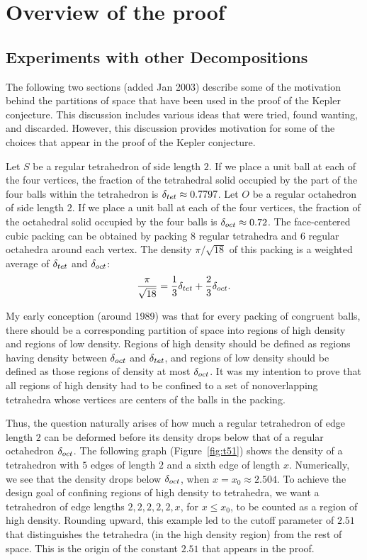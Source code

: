 \chapter{Overview of the proof}

\section{Experiments with other Decompositions}
\label{sec:experiment}

The following two sections (added Jan 2003)  describe some of the
motivation behind the partitions of space that have been used in the
proof of the Kepler conjecture.  This discussion includes various
ideas that were tried, found wanting, and discarded. However, this
discussion provides motivation for some of the choices that appear
in the proof of the Kepler conjecture.

Let $S$ be a regular tetrahedron of side length $2$.  If we place a
unit ball at each of the four vertices, the fraction of the
tetrahedral solid occupied by the part of the four balls within the
tetrahedron is $\delta_{tet}\approx 0.7797$. Let $O$ be a regular
octahedron of side length $2$.  If we place a unit ball at each of
the four vertices, the fraction of the octahedral solid occupied by
the four balls is $\delta_{oct}\approx 0.72$. The face-centered cubic
packing can be obtained by packing $8$ regular tetrahedra and $6$
regular octahedra around each vertex. The density $\pi/\sqrt{18}$ of
this packing is a weighted average of $\delta_{tet}$ and $\delta_{oct}$:
    $$\frac\pi{\sqrt{18}} = \frac13\delta_{tet} + \frac23\delta_{oct}.$$

My early conception (around 1989) was that for every packing of
congruent balls, there should be a corresponding partition of space
into regions of high density and regions of low density. Regions of
high density should be defined as regions having density between
$\delta_{oct}$ and $\delta_{tet}$, and regions of low density should be defined as
those regions of density at most $\delta_{oct}$.  It was my intention to
prove that all regions of high density had to be confined to a set
of nonoverlapping tetrahedra whose vertices are centers of the balls
in the packing.

Thus, the question naturally arises of how much a regular
tetrahedron of edge length $2$ can be deformed before its density
drops below that of a regular octahedron $\delta_{oct}$.  The following
graph (Figure~\ref{fig:t51}) shows the density of a tetrahedron
with $5$ edges of length $2$ and a sixth edge of length $x$.
Numerically, we see that the density drops below $\delta_{oct}$, when
$x=x_0\approx 2.504$. To achieve the design goal of confining
regions of high density to tetrahedra, we want a tetrahedron of
edge lengths $2,2,2,2,2,x$, for $x\le x_0$, to be counted as a
region of high density. Rounding upward, this example led to the
cutoff parameter of $2.51$ that distinguishes the tetrahedra (in
the high density region) from the rest of space. This is the
origin of the constant $2.51$ that appears in the proof.


